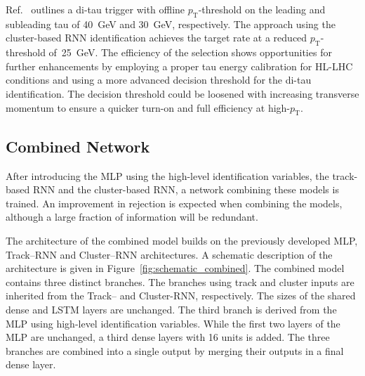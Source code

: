 Ref.~\cite{phase_2_scoping} outlines a di-tau trigger with offline
$p_\text{T}$-threshold on the leading and subleading tau of \SI{40}{\GeV} and
\SI{30}{\GeV}, respectively. The approach using the cluster-based RNN
identification achieves the target rate at a reduced $p_\text{T}$-threshold
of~\SI{25}{\GeV}. The efficiency of the selection shows opportunities for
further enhancements by employing a proper tau energy calibration for HL-LHC
conditions and using a more advanced decision threshold for the di-tau
identification. The decision threshold could be loosened with increasing
transverse momentum to ensure a quicker turn-on and full efficiency at
high-$p_\text{T}$.

\subsection{Combined Network}
\label{sec:rnn_combined}

After introducing the MLP using the high-level identification variables, the
track-based RNN and the cluster-based RNN, a network combining these models is
trained. An improvement in rejection is expected when combining the models,
although a large fraction of information will be redundant.

The architecture of the combined model builds on the previously developed MLP,
Track--RNN and Cluster--RNN architectures. A schematic description of the
architecture is given in Figure~\ref{fig:schematic_combined}. The combined model
contains three distinct branches. The branches using track and cluster inputs
are inherited from the Track-- and Cluster-RNN, respectively. The sizes of the
shared dense and LSTM layers are unchanged. The third branch is derived from the
MLP using high-level identification variables. While the first two layers of the
MLP are unchanged, a third dense layers with 16 units is added. The three
branches are combined into a single output by merging their outputs in a final
dense layer.

